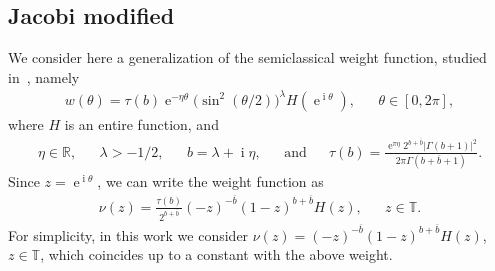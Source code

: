 \documentclass[12pt]{amsart}
\newcommand{\dde}{\operatorname e}
\newcommand{\ddi}{\operatorname i}
\begin{document}
\subsection{Jacobi modified}
We consider here a generalization of the semiclassical weight function, studied in~\cite{Ra10}, namely
\begin{align*}
w(\theta )=\tau(b)\dde ^{-\eta \theta} \big( \sin^2(\theta /2) \big)^{\lambda} H (\dde^{ \ddi \theta}), && \theta \in [0,2\pi],
\end{align*}
where \( H \) is an entire function, and
\begin{align*}
\eta \in \mathbb{R}, &&
\lambda > -1/2 , &&
b=\lambda + \ddi \eta,
&& \text{and} &&
 \tau(b)= \frac{\dde ^{\pi\eta} 2^{b+\overline{b}}|\Gamma(b+1)|^2}{2\pi\Gamma(b+\overline{b}+1)}.
\end{align*}
Since \( z=\dde ^{\ddi \theta} \), we can write the weight function as
\begin{align*}
\nu(z)=\frac{\tau(b)}{2^{b+\overline{b}}}(-z)^{-\overline{b}}(1-z)^{b+\overline{b}} H (z), && z\in\mathbb{T}.
\end{align*}
For simplicity, in this work we consider
\( \nu(z)=(-z)^{-\overline{b}}(1-z)^{b+\overline{b}} H (z) \),
\(z\in\mathbb{T}\),
which coincides up to a constant with the above weight.

\end{document}
